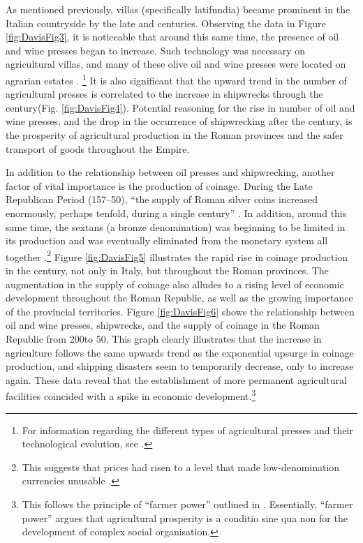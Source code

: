 
As mentioned previously, villas (specifically latifundia) became prominent in the Italian countryside by the late  and  centuries\BC. Observing the data in Figure \ref{fig:DavisFig3}, it is noticeable that around this same time, the presence of oil and wine presses began to increase. 
Such technology was necessary on agricultural villas, and many of these olive oil and wine presses were located on agrarian estates \parencites[74]{Frankel_1997}{Marzano_2013}.
\footnote{For information regarding the different types of agricultural presses and their technological evolution, see \textcite{Frankel_1997}.} It is also significant that the upward trend in the number of agricultural presses is correlated to the increase in shipwrecks through the  century\AD (Fig. \ref{fig:DavisFig4}). Potential reasoning for the rise in number of oil and wine presses, and the drop in the occurrence of shipwrecking after the  century\AD, is the prosperity of agricultural production in the Roman provinces and the safer transport of goods throughout the Empire.





In addition to the relationship between oil presses and shipwrecking, another factor of vital importance is the production of coinage. During the Late Republican Period (157--50\BC), “the supply of Roman silver coins increased enormously, perhaps tenfold, during a single century” \parencite[106]{Hopkins_1980}. In addition, around this same time, the sextans (a bronze denomination) was beginning to be limited in its production and was eventually eliminated from the monetary system all together \parencite[103]{Kay_2014}.\footnote{This suggests that prices had risen to a level that made low-denomination currencies unusable \parencite[103]{Kay_2014}.}  
Figure \ref{fig:DavisFig5} illustrates the rapid rise in coinage production in the  century\BC, not only in Italy, but throughout the Roman provinces. The augmentation in the supply of coinage also alludes to a rising level of economic development throughout the Roman Republic, as well as the growing importance of the provincial territories. Figure \ref{fig:DavisFig6} shows the relationship between oil and wine presses, shipwrecks, and the supply of coinage in the Roman Republic from 200\BC to 50\BC. This graph clearly illustrates that the increase in agriculture follows the same upwards trend as the exponential upsurge in coinage production, and shipping disasters seem to temporarily decrease, only to increase again. These data reveal that the establishment of more permanent agricultural facilities coincided with a spike in economic development.\footnote{This follows the principle of “farmer power” outlined in \textcite[81--88]{Diamond_1997}. Essentially, “farmer power” argues that agricultural prosperity is a conditio sine qua non for the development of complex social organisation.}

